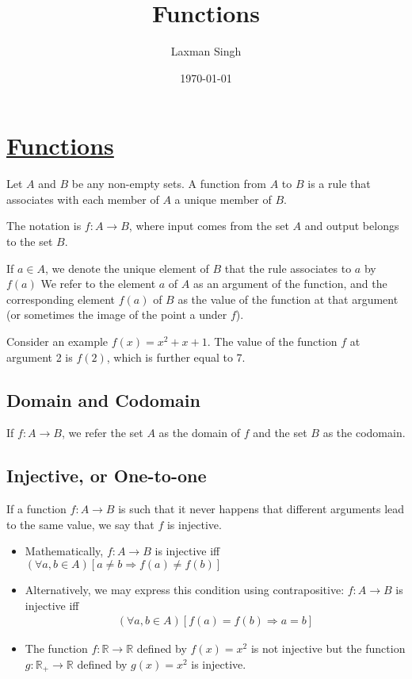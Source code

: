 \documentclass[12pt,a4paper]{article}
\author{Laxman Singh}
\date{\today}
\title{Functions}
\begin{document}
    
\section{\underline{Functions}} 
     
Let \(A\) and \(B\) be any non-empty sets. A function from \(A\) to \(B\) is a rule that associates with each member of \(A\) a unique member of \(B\).

The notation is \(f: A \rightarrow B\), where input comes from the set \(A\) and output belongs to the set \(B\).

If \(a \in A\), we denote the unique element of \(B\) that the rule associates to \(a\) by \(f(a)\)
We refer to the element \(a\) of \(A\) as an argument of the function, and the corresponding element \(f(a)\) of \(B\) as the value of the function at that argument (or sometimes the image of the point a under \(f\)).

Consider an example \(f(x)=x^2+x+1\). The value of the function \(f\) at argument 2 is \(f(2)\), which is further equal to 7.

 \subsection{Domain and Codomain} 
  If \(f: A \rightarrow B\), we refer the set \(A\) as the domain of \(f\) and the set \(B\) as the codomain.  

   \subsection{Injective, or One-to-one} 
   If a function \(f: A \rightarrow B\) is such that it never happens that different arguments lead to the same value, we say that \(f\) is injective.
   \begin{itemize}
       \item Mathematically, \(f: A \rightarrow B\) is injective iff \((\forall a, b \in A)[a \neq b \Rightarrow f(a) \neq f(b)]\)
       
       \item Alternatively, we may express this condition using contrapositive: \(f: A \rightarrow B\) is injective iff
        \begin{align*}
       (\forall a, b \in A)[f(a)=f(b) \Rightarrow a=b]
       \end{align*}

       \item The function \(f: \mathbb{R} \rightarrow \mathbb{R}\) defined by \(f(x)=x^2\) is not injective but the function \(g: \mathbb{R}_{+} \rightarrow \mathbb{R}\) defined by \(g(x)=x^2\) is injective.
       \end{itemize}
\end{document}
